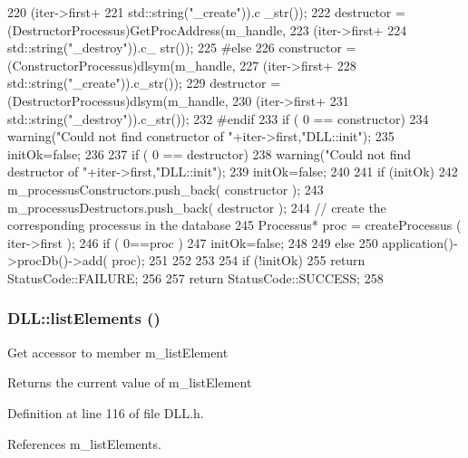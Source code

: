 \begin{DoxyCode}
{{220                                                        (iter->first+
221                                                         std::string("_create")).c
      _str());
222     destructor = (DestructorProcessus)GetProcAddress(m_handle,
223                                                      (iter->first+
224                                                       std::string("_destroy")).c_
      str());
225 #else
226     constructor = (ConstructorProcessus)dlsym(m_handle,
227                                              (iter->first+
228                                              std::string("_create")).c_str());
229     destructor = (DestructorProcessus)dlsym(m_handle,
230                                            (iter->first+
231                                            std::string("_destroy")).c_str());
232 #endif
233     if ( 0 == constructor) {
234       warning("Could not find constructor of "+iter->first,"DLL::init");
235       initOk=false;
236     }
237     if ( 0 == destructor) {
238       warning("Could not find destructor of "+iter->first,"DLL::init");
239       initOk=false;
240     }
241     if (initOk){
242       m_processusConstructors.push_back( constructor );
243       m_processusDestructors.push_back( destructor );
244       // create the corresponding processus in the database
245       Processus* proc = createProcessus ( iter->first );
246       if ( 0==proc ){
247         initOk=false;
248       }
249       else {
250         application()->procDb()->add( proc);
251       }
252     }
253   }
254   if (!initOk){
255     return StatusCode::FAILURE;
256   }
257   return StatusCode::SUCCESS;
258 }
\end{DoxyCode}
\hypertarget{classDLL_adc96628c3ffd637827615fb5a3c71119}{
\subsubsection[{listElements}]{ DLL::listElements ()}}
\label{classDLL_adc96628c3ffd637827615fb5a3c71119}
Get accessor to member m\_\-listElement \begin{DoxyReturn}{Returns}
the current value of m\_\-listElement 
\end{DoxyReturn}


Definition at line 116 of file DLL.h.

References m\_\-listElements.


